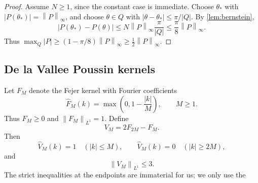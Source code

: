 \documentclass[11pt]{amsart}
\theoremstyle{definition}
\newcommand{\norm}[1]{\left\lVert #1\right\rVert}
\newcommand{\abs}[1]{\left\lvert #1\right\rvert}
\begin{document}
\begin{proof}
Assume $N\ge1$, since the constant case is immediate.  Choose $\theta_*$ with
$\abs{P(\theta_*)}=\norm{P}_\infty$, and choose $\theta\in Q$ with
$\abs{\theta-\theta_*}\le\pi/|Q|$.  By \cref{lem:bernstein},
\[
   \abs{P(\theta_*)-P(\theta)}
   \le N\norm{P}_\infty\frac{\pi}{|Q|}
   \le\frac\pi8\norm{P}_\infty .
\]
Thus
$\max_Q\abs P\ge(1-\pi/8)\norm{P}_\infty\ge\frac12\norm{P}_\infty$.
\end{proof}

\subsection{De la Vallee Poussin kernels}

Let $F_M$ denote the Fejer kernel with Fourier coefficients
\[
   \widehat F_M(k)=\max\!\left(0,1-\frac{|k|}{M}\right),
   \qquad M\ge1 .
\]
Thus $F_M\ge0$ and $\norm{F_M}_{L^1}=1$.  Define
\[
   V_M=2F_{2M}-F_M .
\]
Then
\[
   \widehat V_M(k)=1 \quad (|k|\le M),
   \qquad
   \widehat V_M(k)=0 \quad (|k|\ge2M),
\]
and
\[
   \norm{V_M}_{L^1}\le3 .
\]
The strict inequalities at the endpoints are immaterial for us; we only use the
\end{document}
